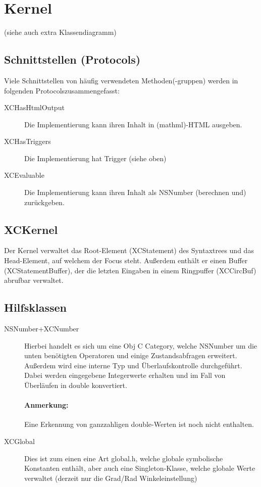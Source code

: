 \section{Kernel}
(siehe auch extra Klassendiagramm)
\subsection{Schnittstellen (Protocols)}
Viele Schnittstellen von häufig verwendeten Methoden(-gruppen) werden in folgenden Protocolszusammengefasst:
\begin{description}
	\item[XCHasHtmlOutput] Die Implementierung kann ihren Inhalt in (mathml)-HTML ausgeben. 
	\item[XCHasTriggers] Die Implementierung hat Trigger (siehe oben)
	\item[XCEvaluable] Die Implementierung kann ihren Inhalt als NSNumber (berechnen und) zurückgeben.
\end{description}
\subsection{XCKernel}
Der Kernel verwaltet das Root-Element (XCStatement) des Syntaxtrees und das Head-Element, auf welchem der Focus steht. Außerdem enthält er einen Buffer (XCStatementBuffer), der die letzten Eingaben in einem Ringpuffer (XCCircBuf) abrufbar verwaltet.
\subsection{Hilfsklassen}
\begin{description}
	\item[NSNumber+XCNumber] Hierbei handelt es sich um eine Obj C Category, welche NSNumber um die unten benötigten Operatoren und einige Zustandsabfragen erweitert. Außerdem wird eine interne Typ und Überlaufskontrolle durchgeführt. Dabei werden eingegebene Integerwerte erhalten und im Fall von Überläufen in double konvertiert.
		\paragraph{Anmerkung:} Eine Erkennung von ganzzahligen double-Werten ist noch nicht enthalten.
	\item[XCGlobal] Dies ist zum einen eine Art global.h, welche globale symbolische Konstanten enthält, aber auch eine Singleton-Klasse, welche globale Werte verwaltet (derzeit nur die Grad/Rad Winkeleinstellung)
\end{description}

